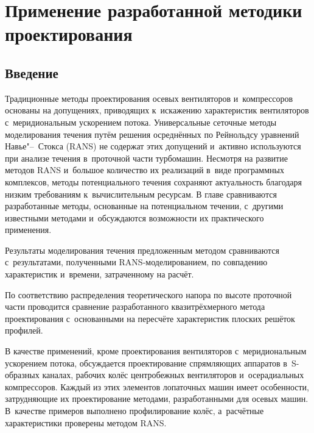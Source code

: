 \chapter{Применение разработанной методики проектирования}

\section{Введение}
Традиционные методы проектирования осевых вентиляторов и~компрессоров основаны на допущениях, приводящих к~искажению характеристик вентиляторов с~меридиональным ускорением потока.
Универсальные сеточные методы моделирования течения путём решения осреднённых по Рейнольдсу уравнений Навье"--~Стокса (RANS) не содержат этих допущений и~активно используются при анализе течения в~проточной части турбомашин.
Несмотря на развитие методов RANS и~большое количество их реализаций в~виде программных комплексов, методы потенциального течения сохраняют актуальность благодаря низким требованиям к~вычислительным ресурсам.
В главе сравниваются разработанные методы, основанные на потенциальном течении, с~другими известными методами и~обсуждаются возможности их практического применения.

Результаты моделирования течения предложенным методом сравниваются с~результатами, полученными RANS-моделированием, по совпадению характеристик и~времени, затраченному на расчёт.

По соответствию распределения теоретического напора по высоте проточной части проводится сравнение разработанного квазитрёхмерного метода проектирования с~основанными на пересчёте характеристик плоских решёток профилей.

В качестве применений, кроме проектирования вентиляторов с~меридиональным ускорением потока, обсуждается проектирование спрямляющих аппаратов в~S-образных каналах, рабочих колёс центробежных вентиляторов и~осерадиальных компрессоров.
Каждый из этих элементов лопаточных машин имеет особенности, затрудняющие их проектирование методами, разработанными для осевых машин.
В~качестве примеров выполнено профилирование колёс, а~расчётные характеристики проверены методом RANS.

